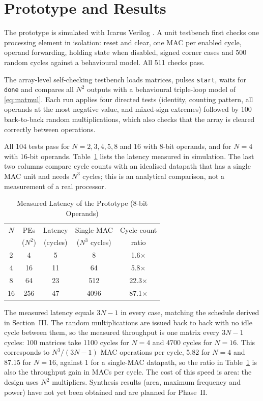 \documentclass[conference]{IEEEtran}
\begin{document}
\section{Prototype and Results}
The prototype is simulated with Icarus Verilog \cite{iverilog}. A unit
testbench first checks one processing element in isolation: reset and clear,
one MAC per enabled cycle, operand forwarding, holding state when disabled,
signed corner cases and 500 random cycles against a behavioural model. All 511
checks pass.

The array-level self-checking testbench loads matrices, pulses \texttt{start}, waits for
\texttt{done} and compares all $N^2$ outputs with a behavioural triple-loop
model of \eqref{eq:matmul}. Each run applies four directed tests (identity,
counting pattern, all operands at the most negative value, and mixed-sign
extremes) followed by 100 back-to-back random multiplications, which also
checks that the array is cleared correctly between operations.

All 104 tests pass for $N = 2, 3, 4, 5, 8$ and $16$ with 8-bit operands, and
for $N = 4$ with 16-bit operands. Table~\ref{tab:results} lists the latency
measured in simulation. The last two columns compare cycle counts with an
idealised datapath that has a single MAC unit and needs $N^3$ cycles; this is an
analytical comparison, not a measurement of a real processor.

\begin{table}[t]
\caption{Measured Latency of the Prototype (8-bit Operands)}
\label{tab:results}
\centering
\begin{tabular}{ccccc}
\toprule
$N$ & PEs & Latency & Single-MAC & Cycle-count \\
    & ($N^2$) & (cycles) & ($N^3$ cycles) & ratio \\
\midrule
2  & 4   & 5  & 8    & 1.6$\times$ \\
4  & 16  & 11 & 64   & 5.8$\times$ \\
8  & 64  & 23 & 512  & 22.3$\times$ \\
16 & 256 & 47 & 4096 & 87.1$\times$ \\
\bottomrule
\end{tabular}
\end{table}

The measured latency equals $3N-1$ in every case, matching the schedule
derived in Section~III. The random multiplications are issued back to back
with no idle cycle between them, so the measured throughput is one matrix every
$3N-1$ cycles: 100 matrices take 1100 cycles for $N=4$ and 4700 cycles for
$N=16$. This corresponds to $N^3/(3N-1)$ MAC operations per cycle, 5.82 for
$N=4$ and 87.15 for $N=16$, against 1 for a single-MAC datapath, so the ratio in
Table~\ref{tab:results} is also the throughput gain in MACs per cycle. The cost of this speed is area: the design uses $N^2$
multipliers. Synthesis results (area, maximum frequency and power) have not yet
been obtained and are planned for Phase~II.
\end{document}
